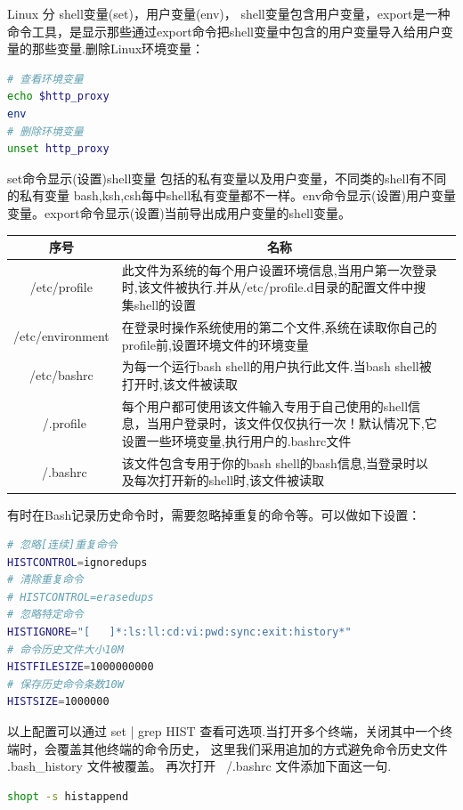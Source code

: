 \documentclass[letter]{book}
\begin{document}
Linux 分 shell变量(set)，用户变量(env)， shell变量包含用户变量，export是一种命令工具，是显示那些通过export命令把shell变量中包含的用户变量导入给用户变量的那些变量.删除Linux环境变量：

\begin{lstlisting}[language=Bash]
# 查看环境变量
echo $http_proxy
env
# 删除环境变量
unset http_proxy
\end{lstlisting}

set命令显示(设置)shell变量 包括的私有变量以及用户变量，不同类的shell有不同的私有变量 bash,ksh,csh每中shell私有变量都不一样。env命令显示(设置)用户变量变量。export命令显示(设置)当前导出成用户变量的shell变量。

\begin{tabular}{cp{8cm}c}
	\hline
	\multirow{1}{*}{序号}
	& \multicolumn{1}{c}{名称}  \\
	\hline			
	/etc/profile  & 此文件为系统的每个用户设置环境信息,当用户第一次登录时,该文件被执行.并从/etc/profile.d目录的配置文件中搜集shell的设置 \\
	\hline	
	/etc/environment & 在登录时操作系统使用的第二个文件,系统在读取你自己的profile前,设置环境文件的环境变量 \\
	\hline
	/etc/bashrc & 为每一个运行bash shell的用户执行此文件.当bash shell被打开时,该文件被读取\\
	\hline
	~/.profile & 每个用户都可使用该文件输入专用于自己使用的shell信息，当用户登录时，该文件仅仅执行一次！默认情况下,它设置一些环境变量,执行用户的.bashrc文件\\
	\hline
	~/.bashrc &  该文件包含专用于你的bash shell的bash信息,当登录时以及每次打开新的shell时,该文件被读取\\
	\hline
\end{tabular}

有时在Bash记录历史命令时，需要忽略掉重复的命令等。可以做如下设置：

\begin{lstlisting}[language=Bash]
# 忽略[连续]重复命令
HISTCONTROL=ignoredups
# 清除重复命令
# HISTCONTROL=erasedups
# 忽略特定命令
HISTIGNORE="[   ]*:ls:ll:cd:vi:pwd:sync:exit:history*"
# 命令历史文件大小10M
HISTFILESIZE=1000000000
# 保存历史命令条数10W
HISTSIZE=1000000
\end{lstlisting}

以上配置可以通过 set | grep HIST 查看可选项.当打开多个终端，关闭其中一个终端时，会覆盖其他终端的命令历史， 这里我们采用追加的方式避免命令历史文件 .bash\_history 文件被覆盖。 再次打开 ~/.bashrc 文件添加下面这一句.

\begin{lstlisting}[language=Bash]
shopt -s histappend
\end{lstlisting}
\end{document}
